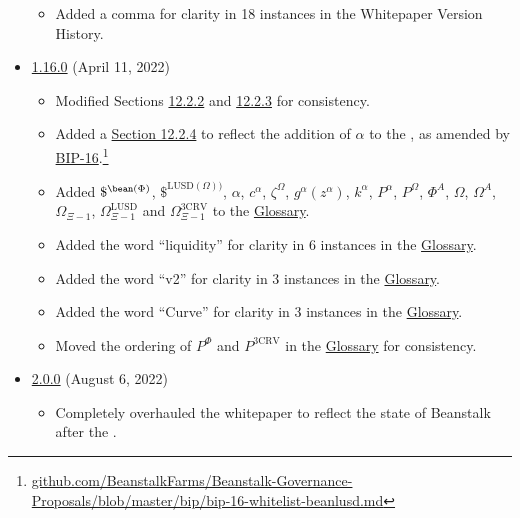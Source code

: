 \documentclass[class=article, crop=false]{standalone}
\begin{document}
\begin{itemize}[topsep=0pt, itemsep=3pt,leftmargin=16pt]
\begin{itemize}
        \item Added a comma for clarity in 18 instances in the Whitepaper Version History.
    \end{itemize}  
        \item \href{https://github.com/BeanstalkFarms/Beanstalk/blob/master/version-history/beanstalk1_16_0.pdf}{1.16.0} (April 11, 2022)
    \begin{itemize}
        \item Modified Sections \hyperlink{subsubsection.12.2.3}{12.2.2} and \hyperlink{subsubsection.12.2.3}{12.2.3} for consistency.
        \item Added a \hyperlink{subsubsection.12.2.4}{Section 12.2.4} to reflect the addition of $\alpha$ to the  , as amended by \href{https://github.com/BeanstalkFarms/Beanstalk-Governance-Proposals/blob/master/bip/bip-16-whitelist-beanlusd.md}{BIP-16}.\footnote{\href{https://github.com/BeanstalkFarms/Beanstalk-Governance-Proposals/blob/master/bip/bip-16-whitelist-beanlusd.md}{github.com/BeanstalkFarms/Beanstalk-Governance-Proposals/blob/master/bip/bip-16-whitelist-beanlusd.md}} 
        \item Added  $\$^{\bean(\Phi)}$, $\$^{\text{LUSD}(\Omega))}$, $\alpha$, $c^{\alpha}$, $\zeta^{\Omega}$, $g^{\alpha}(z^{\alpha})$, $k^{\alpha}$, $P^{\alpha}$, $P^{\Omega}$, $\Phi^{A}$, $\Omega$, $\Omega^{A}$, $\Omega_{\Xi-1}$, $\Omega_{\Xi-1}^{\text{LUSD}}$ and $\Omega_{\Xi-1}^{\text{3CRV}}$ to the \hyperlink{subsection.12.2}{Glossary}. 
        \item Added the word ``liquidity'' for clarity in 6 instances in the \hyperlink{subsection.12.2}{Glossary}.
        \item Added the word ``v2'' for clarity in 3 instances in the \hyperlink{subsection.12.2}{Glossary}.
        \item Added the word ``Curve'' for clarity in 3 instances in the \hyperlink{subsection.12.2}{Glossary}.
        \item Moved the ordering of $P^{\Phi}$ and $P^{\text{3CRV}}$ in the \hyperlink{subsection.12.2}{Glossary} for consistency. 
    \end{itemize}  
        \item \href{https://github.com/BeanstalkFarms/Beanstalk/blob/master/version-history/beanstalk2_0_0.pdf}{2.0.0} (August 6, 2022)
    \begin{itemize}
        \item Completely overhauled the whitepaper to reflect the state of Beanstalk after the .

\end{itemize}
\end{itemize}
\end{document}
